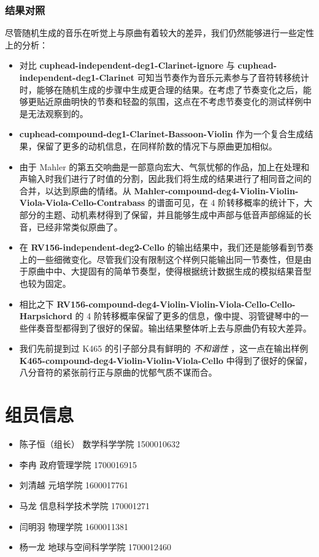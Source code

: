 \documentclass[11pt]{article}
\begin{document}
\section{结果对照}
尽管随机生成的音乐在听觉上与原曲有着较大的差异，我们仍然能够进行一些定性上的分析：
\begin{itemize}
\item 对比 \textbf{cuphead-independent-deg1-Clarinet-ignore} 与 \textbf{cuphead-independent-deg1-Clarinet} 可知当节奏作为音乐元素参与了音符转移统计时，能够在随机生成的步骤中生成更合理的结果。在考虑了节奏变化之后，能够更贴近原曲明快的节奏和轻盈的氛围，这点在不考虑节奏变化的测试样例中是无法观察到的。
\item \textbf{cuphead-compound-deg1-Clarinet-Bassoon-Violin} 作为一个复合生成结果，保留了更多的动机信息，在同样阶数的情况下与原曲更加相似。
\item 由于 Mahler 的第五交响曲是一部意向宏大、气氛忧郁的作品，加上在处理和声输入时我们进行了时值的分割，因此我们将生成的结果进行了相同音之间的合并，以达到原曲的情绪。从 \textbf{Mahler-compound-deg4-Violin-Violin-Viola-Viola-Cello-Contrabass} 的谱面可见，在 4 阶转移概率的统计下，大部分的主题、动机素材得到了保留，并且能够生成中声部与低音声部绵延的长音，已经非常类似原曲了。
\item 在 \textbf{RV156-independent-deg2-Cello} 的输出结果中，我们还是能够看到节奏上的一些细微变化。尽管我们没有限制这个样例只能输出同一节奏性，但是由于原曲中中、大提固有的简单节奏型，使得根据统计数据生成的模拟结果音型也较为固定。
\item 相比之下 \textbf{RV156-compound-deg4-Violin-Violin-Viola-Cello-Cello-Harpsichord} 的 4 阶转移概率保留了更多的信息，像中提、羽管键琴中的一些伴奏音型都得到了很好的保留。输出结果整体听上去与原曲仍有较大差异。
\item 我们先前提到过 K465 的引子部分具有鲜明的 \emph{不和谐性} ，这一点在输出样例 \textbf{K465-compound-deg4-Violin-Violin-Viola-Cello} 中得到了很好的保留，八分音符的紧张前行正与原曲的忧郁气质不谋而合。
\end{itemize}

\part*{组员信息}
\begin{itemize}
\item 陈子恒（组长） 数学科学学院 1500010632
\item 李冉 政府管理学院 1700016915
\item 刘清越 元培学院 1600017761
\item 马龙 信息科学技术学院 170001271
\item 闫明羽 物理学院 1600011381
\item 杨一龙 地球与空间科学学院 1700012460

\end{itemize}



\end{document}
